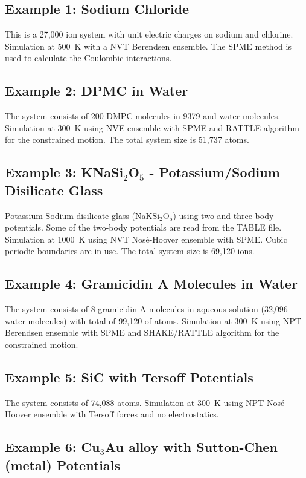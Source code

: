 \subsection{Example 1: Sodium Chloride}

This is a 27,000 ion system with unit electric charges on sodium and
chlorine.  Simulation at 500~K with a NVT Berendsen ensemble.  The SPME
method is used to calculate the Coulombic interactions.

\subsection{Example 2: DPMC in Water}

The system consists of 200 DMPC molecules in 9379 and water molecules.
Simulation at 300~K using NVE ensemble with SPME and RATTLE algorithm
for the constrained motion.  The total system size is 51,737 atoms.

\subsection{Example 3: KNaSi$_{2}$O$_{5}$ - Potassium/Sodium Disilicate Glass}

Potassium Sodium disilicate glass (NaKSi$_{2}$O$_{5}$) using two and
three-body potentials.  Some of the two-body potentials are read
from the TABLE file.  Simulation at 1000~K using NVT Nos\'e-Hoover
ensemble with SPME.  Cubic periodic boundaries are in use.  The
total system size is 69,120 ions.

\subsection{Example 4: Gramicidin A Molecules in Water}

The system consists of 8 gramicidin A molecules in aqueous solution
(32,096 water molecules) with total of 99,120 of atoms.  Simulation
at 300~K using NPT Berendsen ensemble with SPME and SHAKE/RATTLE
algorithm for the constrained motion.

\subsection{Example 5: SiC with Tersoff Potentials}

The system consists of 74,088 atoms.  Simulation at 300~K using NPT
Nos\'e-Hoover ensemble with Tersoff forces and no electrostatics.

\subsection{Example 6: Cu$_{3}$Au alloy with Sutton-Chen (metal) Potentials}

